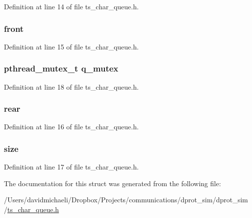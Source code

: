 Definition at line 14 of file ts\-\_\-char\-\_\-queue.\-h.

\hypertarget{structts__queue_a1dfd5b5d6a134e4dca437c77ed8c6a08}{
\subsubsection[{front}]{ front}}\label{structts__queue_a1dfd5b5d6a134e4dca437c77ed8c6a08}


Definition at line 15 of file ts\-\_\-char\-\_\-queue.\-h.

\hypertarget{structts__queue_a03fe278d10d0b596601485a37a3c5c42}{
\subsubsection[{q\-\_\-mutex}]{\setlength{\rightskip}{0pt plus 5cm}pthread\-\_\-mutex\-\_\-t q\-\_\-mutex}}\label{structts__queue_a03fe278d10d0b596601485a37a3c5c42}


Definition at line 18 of file ts\-\_\-char\-\_\-queue.\-h.

\hypertarget{structts__queue_ae2307aa4cbe13c4e3f4e5f88bfe3346b}{
\subsubsection[{rear}]{ rear}}\label{structts__queue_ae2307aa4cbe13c4e3f4e5f88bfe3346b}


Definition at line 16 of file ts\-\_\-char\-\_\-queue.\-h.

\hypertarget{structts__queue_af8fd9ce16b371c8a3bf5e0b37a69419f}{
\subsubsection[{size}]{ size}}\label{structts__queue_af8fd9ce16b371c8a3bf5e0b37a69419f}


Definition at line 17 of file ts\-\_\-char\-\_\-queue.\-h.



The documentation for this struct was generated from the following file\-:\begin{DoxyCompactItemize}
\item 
/\-Users/davidmichaeli/\-Dropbox/\-Projects/communications/dprot\-\_\-sim/dprot\-\_\-sim/\hyperlink{ts__char__queue_8h}{ts\-\_\-char\-\_\-queue.\-h}\end{DoxyCompactItemize}
